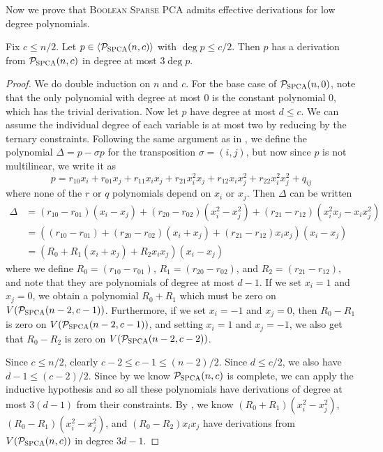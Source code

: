 Now we prove that \textsc{Boolean Sparse PCA} admits effective derivations for low degree polynomials.
\begin{lemma}
Fix $c \leq n/2$. Let $p \in \langle \mathcal P_{\textsc{SPCA}}(n,c) \rangle$ with $\deg p \leq c/2$. Then $p$ has a derivation from $\mathcal P_{\textsc{SPCA}}(n,c)$ in degree at most $3\deg p$.
\end{lemma}
\begin{proof}
We do double induction on $n$ and $c$. For the base case of $\mathcal P_{\textsc{SPCA}}(n,0)$, note that the only polynomial with degree at most $0$ is the constant polynomial $0$, which has the trivial derivation. Now let $p$ have degree at most $d \leq c$. We can assume the individual degree of each variable is at most two by reducing by the ternary constraints. Following the same argument as in , we define the polynomial $\Delta = p - \sigma p$ for the transposition $\sigma = (i,j)$, but now since $p$ is not multilinear, we write it as 
\[p = r_{10}x_i + r_{01}x_j + r_{11}x_ix_j + r_{21}x_i^2x_j + r_{12}x_ix_j^2 + r_{22}x_i^2x_j^2 + q_{ij}\]
where none of the $r$ or $q$ polynomials depend on $x_i$ or $x_j$. Then $\Delta$ can be written
\begin{align*}
\Delta &= (r_{10} - r_{01})(x_i - x_j) + (r_{20} - r_{02})(x_i^2 - x_j^2) + (r_{21} - r_{12})(x_i^2x_j - x_ix_j^2) \\
&= ((r_{10} - r_{01}) + (r_{20} - r_{02})(x_i+x_j) + (r_{21} - r_{12})x_ix_j)(x_i - x_j) \\
&= (R_0 + R_1(x_i + x_j) + R_2x_ix_j)(x_i - x_j)
\end{align*}
where we define $R_0 = (r_{10} - r_{01})$, $R_1 = (r_{20} - r_{02})$, and $R_2 = (r_{21} - r_{12})$, and note that they are polynomials of degree at most $d-1$. If we set $x_i = 1$ and $x_j = 0$, we obtain a polynomial $R_0 + R_1$ which must be zero on $V(\mathcal P_{\textsc{SPCA}}(n-2,c-1))$. Furthermore, if we set $x_i = -1$ and $x_j = 0$, then $R_0 - R_1$ is zero on $V(\mathcal P_{\textsc{SPCA}}(n-2,c-1))$, and setting $x_i = 1$ and $x_j = -1$, we also get that $R_0 - R_2$ is zero on $V(\mathcal P_{\textsc{SPCA}}(n-2,c-2))$. 

Since $c \leq n/2$, clearly $c-2 \leq c-1 \leq (n-2)/2$. Since $d \leq c/2$, we also have $d-1 \leq (c-2)/2$. Since by  we know $\mathcal P_{\textsc{SPCA}}(n,c)$ is complete, we can apply the inductive hypothesis and so all these polynomials have derivations of degree at most $3(d-1)$ from their constraints. By , we know $(R_0+R_1)(x_i^2-x_j^2)$, $(R_0 - R_1)(x_i^2-x_j^2)$, and $(R_0 - R_2)x_ix_j$ have derivations from $V(\mathcal P_{\textsc{SPCA}}(n,c))$ in degree $3d-1$.


\end{proof}
